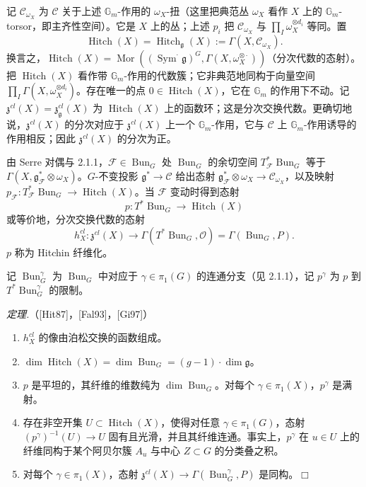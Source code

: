  记 $\mathcal{C}_{\omega_X}$ 为 $\mathcal{C}$ 关于上述 $\mathbb{G}_m$-作用的 $\omega_X$-扭（这里把典范丛 $\omega_X$ 看作 $X$ 上的 $\mathbb{G}_m$-torsor，即主齐性空间）。它是 $X$ 上的丛；上述 $p_i$ 把 $\mathcal{C}_{\omega_X}$ 与 $\prod_I\omega_X^{\otimes d_i}$ 等同。置
\[
\operatorname{Hitch}(X)=\operatorname{Hitch}_{\mathfrak{g}}(X):=\Gamma(X,\mathcal{C}_{\omega_X}).
\]
换言之，$\operatorname{Hitch}(X)=\operatorname{Mor}((\operatorname{Sym}^{\cdot}\mathfrak{g})^{G},\Gamma(X,\omega_X^{\otimes\cdot}))$（分次代数的态射）。把 $\operatorname{Hitch}(X)$ 看作带 $\mathbb{G}_m$-作用的代数簇；它非典范地同构于向量空间 $\prod_I\Gamma(X,\omega_X^{\otimes d_i})$。存在唯一的点 $0\in\operatorname{Hitch}(X)$，它在 $\mathbb{G}_m$ 的作用下不动。记 $\mathfrak{z}^{cl}(X)=\mathfrak{z}_{\mathfrak{g}}^{cl}(X)$ 为 $\operatorname{Hitch}(X)$ 上的函数环；这是分次交换代数。更确切地说，$\mathfrak{z}^{cl}(X)$ 的分次对应于 $\mathfrak{z}^{cl}(X)$ 上一个 $\mathbb{G}_m$-作用，它与 $\mathcal{C}$ 上 $\mathbb{G}_m$-作用诱导的作用相反；因此 $\mathfrak{z}^{cl}(X)$ 的分次为正。

 由 Serre 对偶与 2.1.1，$\mathcal{F}\in\operatorname{Bun}_G$ 处 $\operatorname{Bun}_G$ 的余切空间 $T_{\mathcal{F}}^{*}\operatorname{Bun}_G$ 等于 $\Gamma(X,\mathfrak{g}_{\mathcal{F}}^{*}\otimes\omega_X)$。$G$-不变投影 $\mathfrak{g}^{*}\to\mathcal{C}$ 给出态射 $\mathfrak{g}_{\mathcal{F}}^{*}\otimes\omega_X\to\mathcal{C}_{\omega_X}$，以及映射 $p_{\mathcal{F}}:T_{\mathcal{F}}^{*}\operatorname{Bun}_G\to\operatorname{Hitch}(X)$。当 $\mathcal{F}$ 变动时得到态射
\[
p:T^{*}\operatorname{Bun}_G\to\operatorname{Hitch}(X)
\]
或等价地，分次交换代数的态射
\[
h_X^{cl}:\mathfrak{z}^{cl}(X)\to\Gamma(T^{*}\operatorname{Bun}_G,\mathcal{O})=\Gamma(\operatorname{Bun}_G,P).
\]
$p$ 称为 Hitchin 纤维化。


记 $\operatorname{Bun}_G^{\gamma}$ 为 $\operatorname{Bun}_G$ 中对应于 $\gamma\in\pi_1(G)$ 的连通分支（见 2.1.1），记 $p^{\gamma}$ 为 $p$ 到 $T^{*}\operatorname{Bun}_G^{\gamma}$ 的限制。

 \emph{定理.}（[Hit87]，[Fal93]，[Gi97]）
\begin{enumerate}[label=(\roman*),leftmargin=2.6em]
\item $h_X^{cl}$ 的像由泊松交换的函数组成。
\item $\dim\operatorname{Hitch}(X)=\dim\operatorname{Bun}_G=(g-1)\cdot\dim\mathfrak{g}$。
\item $p$ 是平坦的，其纤维的维数纯为 $\dim\operatorname{Bun}_G$。对每个 $\gamma\in\pi_1(X)$，$p^{\gamma}$ 是满射。
\item 存在非空开集 $U\subset\operatorname{Hitch}(X)$，使得对任意 $\gamma\in\pi_1(G)$，态射 $(p^{\gamma})^{-1}(U)\to U$ 固有且光滑，并且其纤维连通。事实上，$p^{\gamma}$ 在 $u\in U$ 上的纤维同构于某个阿贝尔簇 $A_u$ 与中心 $Z\subset G$ 的分类叠之积。
\item 对每个 $\gamma\in\pi_1(X)$，态射 $\mathfrak{z}^{cl}(X)\to\Gamma(\operatorname{Bun}_G^{\gamma},P)$ 是同构。\hfill$\Box$
\end{enumerate}

